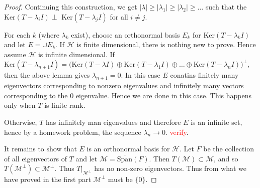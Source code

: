 \begin{proof}
  Continuing this construction, we get $|\lambda| \ge |\lambda_1| \ge
  |\lambda_2| \ge \ldots$ such that the $\textrm{Ker}(T - \lambda_iI)
  \perp \textrm{ Ker}(T - \lambda_j I)$ for all $i \neq j$.

  For each $k$ (where $\lambda_k$ exist), choose an orthonormal basis
  $E_k$ for $\textrm{Ker}(T - \lambda_k I)$ and let $E = \cup E_k$.
  If $\mathcal{H}$ is finite dimensional, there is nothing new to
  prove. Hence assume $\mathcal{H}$ is infinite dimensional. If
  $\textrm{Ker}(T - \lambda_{n+1}I) = \big(\textrm{Ker}(T - \lambda
    I) \oplus \textrm{Ker}(T - \lambda_1 I ) \oplus \ldots \oplus
  \textrm{Ker}(T - \lambda_{n} I) \big)^\perp$, then the above lemma
  gives $\lambda_{n+1} = 0$. In this case $E$ conatins finitely many
  eigenvectors corresponding to nonzero eigenvalues and infinitely
  many vectors corresponding to the $0$ eigenvalue. Hence we are done
  in this case. This happens only when $T$ is finite rank.

  Otherwise, $T$ has infinitely man eigenvalues and therefore $E$ is
  an infinite set, hence by a homework problem, the sequence
  $\lambda_n \to 0$. \textcolor{red}{verify}.

  It remains to show that $E$ is an orthonormal basis for
  $\mathcal{H}$. Let $F$ be the collection of all eigenvectors of $T$
  and let $\mathcal{M} = \overline{ \textrm{Span}}(F)$.
  Then $T(\mathcal{M}) \subset \mathcal{M}$, and so
  $T(\mathcal{M}^\perp) \subset \mathcal{M}^\perp$. Thus
  $T|_{\mathcal{ M}^\perp}$ has no non-zero eigenvectors. Thus from
  what we have proved in the first part $\mathcal{M}^\perp$ must be $\{ 0 \}$.
\end{proof}


